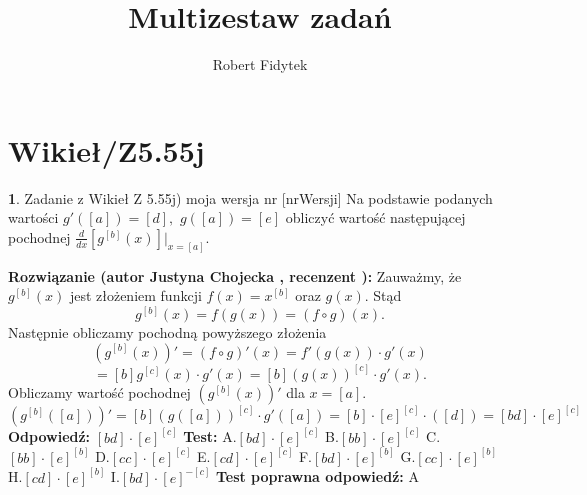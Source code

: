 \documentclass[12pt, a4paper]{article}
\title{Multizestaw zadań}
\author{Robert Fidytek}
\date{}
\theoremstyle{definition} %
\newtheorem{zad}{}
\newcommand{\kategoria}[1]{\section{#1}} %
\newcommand{\zadStart}[1]{\begin{zad}#1\newline} %
\newcommand{\zadStop}{\end{zad}}   %
\newcommand{\rozwStart}[2]{\noindent \textbf{Rozwiązanie (autor #1 , recenzent #2): }\newline} %
\newcommand{\rozwStop}{\newline}                                            %
\newcommand{\odpStart}{\noindent \textbf{Odpowiedź:}\newline}    %
\newcommand{\odpStop}{\newline}                                             %
\newcommand{\testStart}{\noindent \textbf{Test:}\newline} %
\newcommand{\testStop}{\newline} %
\newcommand{\kluczStart}{\noindent \textbf{Test poprawna odpowiedź:}\newline} %
\newcommand{\kluczStop}{\newline} %
\begin{document}
\maketitle


\kategoria{Wikieł/Z5.55j}
\zadStart{Zadanie z Wikieł Z 5.55j) moja wersja nr [nrWersji]}
Na podstawie podanych wartości $g'([a])=[d],$ $g([a])=[e]$ obliczyć wartość następującej pochodnej $\frac{d}{dx}\left[g^{[b]}(x)\right]\big |_{x=[a]}$.
\zadStop
\rozwStart{Justyna Chojecka}{}
Zauważmy, że $g^{[b]}(x)$ jest złożeniem funkcji $f(x)=x^{[b]}$ oraz $g(x)$. Stąd 
$$g^{[b]}(x)=f(g(x))=(f\circ g)(x).$$
Następnie obliczamy pochodną powyższego złożenia
$$(g^{[b]}(x))'=(f\circ g)'(x)=f'(g(x))\cdot g'(x)$$$$=[b]g^{[c]}(x)\cdot g'(x)=[b](g(x))^{[c]}\cdot g'(x).$$
Obliczamy wartość pochodnej $(g^{[b]}(x))'$ dla $x=[a]$.
$$(g^{[b]}([a]))'=[b](g([a]))^{[c]}\cdot g'([a])=[b]\cdot [e]^{[c]}\cdot ([d])=[bd]\cdot [e]^{[c]}$$
\rozwStop
\odpStart
$[bd]\cdot [e]^{[c]}$
\odpStop
\testStart
A.$[bd]\cdot [e]^{[c]}$
B.$[bb]\cdot [e]^{[c]}$
C.$[bb]\cdot [e]^{[b]}$
D.$[cc]\cdot [e]^{[c]}$
E.$[cd]\cdot [e]^{[c]}$
F.$[bd]\cdot [e]^{[b]}$
G.$[cc]\cdot [e]^{[b]}$
H.$[cd]\cdot [e]^{[b]}$
I.$[bd]\cdot [e]^{-[c]}$
\testStop
\kluczStart
A
\kluczStop
\end{document}
